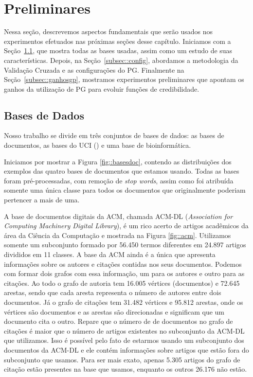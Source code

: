 \section{Preliminares}
\label{sec::preliminares}

Nessa seção, descrevemos aspectos fundamentais que serão usados nos experimentos efetuados nas próximas seções desse capítulo. 
Iniciamos com a Seção~\ref{subsec::base}, que mostra todas as bases usadas, assim como um estudo de suas características.
Depois, na Seção~\ref{subsec::config}, abordamos a metodologia da Validação Cruzada e as configurações do \textsc{PG}.
Finalmente na Seção~\ref{subsec::ganhosgp}, mostramos experimentos preliminares que apontam os ganhos da utilização de \textsc{PG} para evoluir funções de credibilidade.


\subsection{Bases de Dados}
\label{subsec::base}

Nosso trabalho se divide em três conjuntos de bases de dados: as bases de documentos, as bases do \textsc{UCI} (\cite{UCI98}) e uma base de bioinformática.

Iniciamos por mostrar a Figura \ref{fig::basesdoc}, contendo as distribuições dos exemplos das quatro bases de documentos que estamos usando. Todas as bases foram pré-processadas, com remoção de \textit{stop words}, assim como foi atribuída somente uma única classe para todos os documentos que originalmente poderiam pertencer a mais de uma.

A base de documentos digitais da \textsc{ACM}, chamada \textsc{ACM-DL} (\textit{Association for Computing Machinery Digital Library}), é um rico acerto de artigos acadêmicos da área da Ciência da Computação e mostrada na Figura \ref{fig::acm}. Utilizamos somente um subconjunto formado por 56.450 termos diferentes em 24.897 artigos divididos em 11 classes. 
A base da \textsc{ACM} ainda é a única que apresenta informações sobre os autores e citações contidas nos seus documentos. 
Podemos com formar dois grafos com essa informação, um para os autores e outro para as citações.
Ao todo o grafo de autoria tem 16.005 vértices (documentos) e 72.645 arestas, sendo que cada aresta representa o número de autores entre dois documentos.
Já o grafo de citações tem 31.482 vértices e 95.812 arestas, onde os vértices são documentos e as arestas são direcionadas e significam que um documento cita o outro. 
Repare que o número de de documentos no grafo de citações é maior que o número de artigos existentes no subconjunto da \textsc{ACM-DL} que utilizamos. Isso é possível pelo fato de estarmos usando um subconjunto dos documentos da \textsc{ACM-DL} e ele contém informações sobre artigos que estão fora do subconjunto que usamos. Para ser mais exato, apenas 5.305 artigos do grafo de citação estão presentes na base que usamos, enquanto os outros 26.176 não estão.

